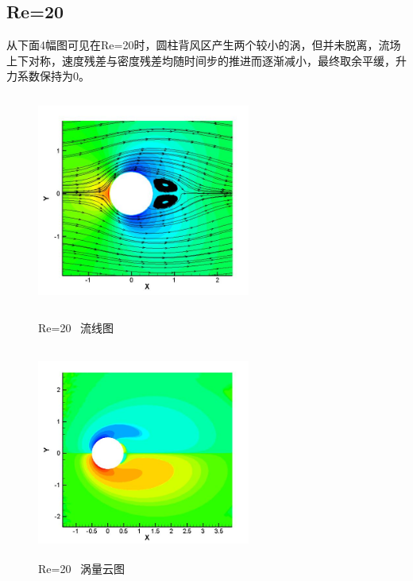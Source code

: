 \documentclass[UTF8]{ctexart}
\begin{document}
\subsection{Re=20}
从下面4幅图可见在Re=20时，圆柱背风区产生两个较小的涡，但并未脱离，流场上下对称，速度残差与密度残差均随时间步的推进而逐渐减小，最终取余平缓，升力系数保持为0。
\begin{figure}[htbp]\centering
\begin{minipage}{7cm}
\includegraphics[height=7cm,width=7cm]{../pic/Streamline_20.JPG}
\caption{Re=20 \ 流线图}
\end{minipage}
\begin{minipage}{7cm}
\includegraphics[height=7cm,width=7cm]{../pic/Vorticity_20.JPG}
\caption{Re=20 \ 涡量云图}
\end{minipage}


\end{figure}
\end{document}
